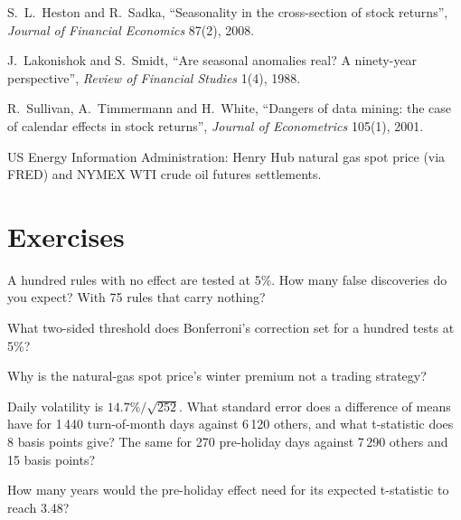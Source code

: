 \begin{omsources}
\item S.~L.~Heston and R.~Sadka, ``Seasonality in the cross-section of stock returns'', \emph{Journal of Financial Economics} 87(2), 2008.
\item J.~Lakonishok and S.~Smidt, ``Are seasonal anomalies real? A ninety-year perspective'', \emph{Review of Financial Studies} 1(4), 1988.
\item R.~Sullivan, A.~Timmermann and H.~White, ``Dangers of data mining: the case of calendar effects in stock returns'', \emph{Journal of Econometrics}
105(1), 2001.
\item US Energy Information Administration: Henry Hub natural gas spot price (via FRED) and NYMEX WTI crude oil futures settlements.
\end{omsources}

\section{Exercises}

\begin{exercise}[$\star$]\label{exo:s1:seasonality-and-calendar-effects:1}
A hundred rules with no effect are tested at 5\%. How many false discoveries do you expect? With 75 rules that carry nothing?
\end{exercise}

\begin{exercise}[$\star$]\label{exo:s1:seasonality-and-calendar-effects:2}
What two-sided threshold does Bonferroni's correction set for a hundred tests at 5\%?
\end{exercise}

\begin{exercise}[$\star$]\label{exo:s1:seasonality-and-calendar-effects:3}
Why is the natural-gas spot price's winter premium not a trading strategy?
\end{exercise}

\begin{exercise}[$\star\star$]\label{exo:s1:seasonality-and-calendar-effects:4}
Daily volatility is $14.7\%/\sqrt{252}$. What standard error does a difference of means have for 1\,440 turn-of-month days against 6\,120 others, and what
t-statistic does 8 basis points give? The same for 270 pre-holiday days against 7\,290 others and 15 basis points?
\end{exercise}

\begin{exercise}[$\star\star$]\label{exo:s1:seasonality-and-calendar-effects:5}
How many years would the pre-holiday effect need for its expected t-statistic to reach 3.48?
\end{exercise}

